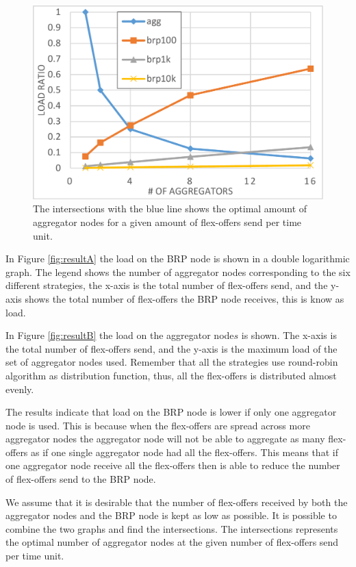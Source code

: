 \documentclass{ifacconf}
\begin{document}
\begin{figure}%
\centering
\includegraphics[width=0.75\columnwidth]{images/resultD.pdf}
\caption{The intersections with the blue line shows the optimal amount of aggregator nodes for a given amount of flex-offers send per time unit.}%
\label{fig:resultC}%
\end{figure}


In Figure \ref{fig:resultA} the load on the BRP node is shown in a double logarithmic graph. 
The legend shows the number of aggregator nodes corresponding to the six different strategies, 
the x-axis is the total number of flex-offers send, 
and the y-axis shows the total number of flex-offers the BRP node receives, this is know as load.

In Figure \ref{fig:resultB} the load on the aggregator node\(s\) is shown. 
The x-axis is the total number of flex-offers send, 
and the y-axis is the maximum load of the set of aggregator nodes used. 
Remember that all the strategies use round-robin algorithm as distribution function, thus, all the flex-offers is distributed almost evenly. 

The results indicate that load on the BRP node is lower if only one aggregator node is used. 
This is because when the flex-offers are spread across more aggregator nodes the aggregator node will not be able to aggregate as many flex-offers as if one single aggregator node had all the flex-offers. 
This means that if one aggregator node receive all the flex-offers then is able to reduce the number of flex-offers send to the BRP node.

We assume that it is desirable that the number of flex-offers received by both the aggregator nodes and the BRP node is kept as low as possible.
It is possible to combine the two graphs and find the intersections.
The intersections represents the optimal number of aggregator nodes at the given number of flex-offers send per time unit. 
\end{document}
